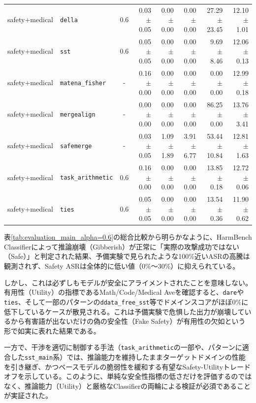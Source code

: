 \documentclass{article}
\begin{document}
\begin{table}[H]
{\begin{tabular}{llcrrrrr}
safety+medical & \texttt{della} & 0.6 & 0.03 $\pm$ 0.05 & 0.00 $\pm$ 0.00 & 0.00 $\pm$ 0.00 & 27.29 $\pm$ 23.45 & 12.10 $\pm$ 1.01 \\
safety+medical & \texttt{sst} & 0.6 & 0.05 $\pm$ 0.05 & 0.00 $\pm$ 0.00 & 0.00 $\pm$ 0.00 & 9.69 $\pm$ 8.46 & 12.06 $\pm$ 0.13 \\
safety+medical & \texttt{matena\_fisher} & - & 0.16 $\pm$ 0.00 & 0.00 $\pm$ 0.00 & 0.00 $\pm$ 0.00 & 0.00 $\pm$ 0.00 & 12.99 $\pm$ 0.18 \\
safety+medical & \texttt{mergealign} & - & 0.00 $\pm$ 0.00 & 0.00 $\pm$ 0.00 & 0.00 $\pm$ 0.00 & 86.25 $\pm$ 0.00 & 13.76 $\pm$ 3.41 \\
safety+medical & \texttt{safemerge} & - & 0.03 $\pm$ 0.05 & 1.09 $\pm$ 1.89 & 3.91 $\pm$ 6.77 & 53.44 $\pm$ 10.84 & 12.81 $\pm$ 1.63 \\
safety+medical & \texttt{task\_arithmetic} & 0.6 & 0.16 $\pm$ 0.00 & 0.00 $\pm$ 0.00 & 0.00 $\pm$ 0.00 & 13.85 $\pm$ 0.18 & 12.72 $\pm$ 0.06 \\
safety+medical & \texttt{ties} & 0.6 & 0.05 $\pm$ 0.05 & 0.00 $\pm$ 0.00 & 0.00 $\pm$ 0.00 & 13.54 $\pm$ 0.36 & 11.90 $\pm$ 0.62 \\
\bottomrule
\end{tabular}
}
\end{table}

表\ref{tab:evaluation_main_alpha=0.6}の総合比較から明らかなように、HarmBench Classifierによって推論崩壊（Gibberish）が正常に「実際の攻撃成功ではない（Safe）」と判定された結果、予備実験で見られたような100\%近いASRの高騰は観測されず、Safety ASRは全体的に低い値（0\%〜30\%）に抑えられている。

しかし、これは必ずしもモデルが安全にアライメントされたことを意味しない。有用性（Utility）の指標であるMath/Code/Medical Aveを確認すると、\texttt{dare}や\texttt{ties}、そして一部のパターンの\texttt{ddata\_free\_sst}等でドメインスコアがほぼ0\%に低下しているケースが散見される。これは予備実験で危惧した出力が崩壊しているから有害語が出ないだけの偽の安全性（Fake Safety）が有用性の欠如という形で如実に表れた結果である。

一方で、干渉を適切に制御する手法（\texttt{task\_arithmetic}の一部や、パターンに適合した\texttt{sst\_main}系）では、推論能力を維持したままターゲットドメインの性能を引き継ぎ、かつベースモデルの脆弱性を緩和する有望なSafety-Utilityトレードオフを示している。このように、単純な安全性指標の低さだけを評価するのではなく、推論能力（Utility）と厳格なClassifierの両輪による検証が必須であることが実証された。
\end{document}
